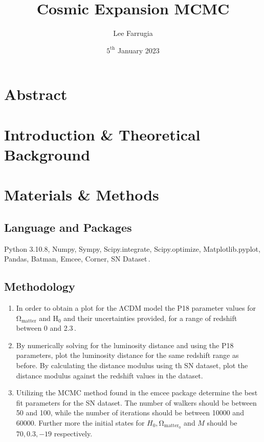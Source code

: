 \documentclass[12pt, a4paper]{article}
\title{Cosmic Expansion MCMC}
\date{\(5^\mathrm{{th}}\) January 2023}
\author{Lee Farrugia}
\begin{document}
    
\maketitle
\thispagestyle{titlepagestyle}
\pagestyle{mystyle}

\section{Abstract}

\section{Introduction \& Theoretical Background}


\section{Materials \& Methods}
    \subsection{Language and Packages}
        Python 3.10.8, Numpy, Sympy, Scipy.integrate, Scipy.optimize, Matplotlib.pyplot, Pandas, Batman, Emcee, Corner, SN Dataset\,.
    \subsection{Methodology}
        \begin{enumerate}
            \item In order to obtain a plot for the \(\mathrm{\Lambda}\)CDM model the P18 parameter values for \(\mathrm{\Omega}_{\mathrm{matter}}\) and H\(_0\) and their uncertainties provided, for a range of redshift between 0 and 2.3\,.
            \item By numerically solving for the luminosity distance and using the P18 parameters, plot the luminosity distance for the same redshift range as before. By calculating the distance modulus using th SN dataset, plot the distance modulus against the redshift values in the dataset.
            \item Utilizing the MCMC method found in the emcee package determine the best fit parameters for the SN dataset. The number of walkers should be between 50 and 100, while the number of iterations should be between 10000 and 60000. Further more the initial states for \(H_0, \mathrm{\Omega}_{\mathrm{matter_0}}\) and \(M\) should be \(70, 0.3, -19\) respectively.
        \end{enumerate}
\end{document}
